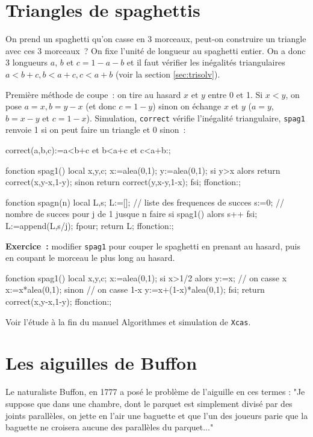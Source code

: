 \documentclass[12pt,a4paper]{book}
\begin{document}
\begin{giacjshere}
\section{Triangles de spaghettis}
On prend un spaghetti qu'on casse en 3 morceaux, peut-on construire
un triangle avec ces 3 morceaux~?
On fixe l'unit\'e de longueur au spaghetti entier. On a donc
3 longueurs $a$, $b$ et $c=1-a-b$ et il faut v\'erifier
les in\'egalit\'es triangulaires $a<b+c, b<a+c, c<a+b$ (voir
la section \ref{sec:trisolv}).

Premi\`ere m\'ethode de coupe~: on tire au hasard $x$ et $y$ entre 0 et 1.
Si $x<y$, on pose $a=x, b=y-x$ (et donc $c=1-y$) sinon on \'echange $x$ et $y$
($a=y$, $b=x-y$ et $c=1-x$).
Simulation, \verb|correct| v\'erifie l'in\'egalit\'e triangulaire,
\verb|spag1| renvoie 1 si on peut faire un triangle et 0 sinon~:
\begin{giaconload}
correct(a,b,c):=a<b+c et b<a+c et c<a+b:;

fonction spag1()
  local x,y,c;
  x:=alea(0,1);
  y:=alea(0,1);
  si y>x alors 
    return correct(x,y-x,1-y); 
  sinon 
    return correct(y,x-y,1-x); 
  fsi;
ffonction:;

fonction spagn(n)
  local L,s;
  L:=[]; // liste des frequences de succes
  s:=0; // nombre de succes
  pour j de 1 jusque n faire
    si spag1() alors s++ fsi; 
    L:=append(L,s/j); 
  fpour;
  return L;
ffonction:;
\end{giaconload}
{\bf Exercice~:} modifier \verb|spag1| pour
couper le spaghetti en prenant au hasard, puis en coupant le
morceau le plus long au hasard.
\begin{giacprog}
fonction spag1()
  local x,y,c;
  x:=alea(0,1);
  si x>1/2 alors
    y:=x; // on casse x
    x:=x*alea(0,1); 
  sinon // on casse 1-x
    y:=x+(1-x)*alea(0,1);
  fsi;
  return correct(x,y-x,1-y); 
ffonction:;
\end{giacprog}
Voir l'\'etude \`a la fin du manuel Algorithmes
et simulation de {\tt Xcas}.

\section{Les aiguilles de Buffon}\label{sec:buffon}
Le naturaliste Buffon, en 1777 a pos\'e le probl\`eme de l'aiguille en ces 
termes : "Je suppose que dans une chambre, dont le parquet est simplement 
divis\'e par des joints parall\`eles, on jette en l'air une baguette et que 
l'un des joueurs parie que la baguette ne croisera aucune des parall\`eles du
parquet..."


\end{giacjshere}
\end{document}
